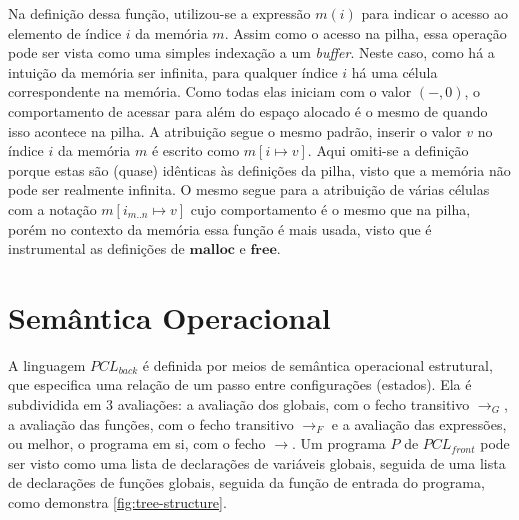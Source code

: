 Na definição dessa função, utilizou-se a expressão $m(i)$ para indicar o acesso ao elemento de índice $i$ da memória $m$. Assim como o acesso na pilha, essa operação pode ser vista como uma simples indexação a um \emph{buffer}. Neste caso, como há a intuição da memória ser infinita, para qualquer índice $i$ há uma célula correspondente na memória. Como todas elas iniciam com o valor $(-,0)$, o comportamento de acessar para além do espaço alocado é o mesmo de quando isso acontece na pilha. A atribuição segue o mesmo padrão, inserir o valor $v$ no índice $i$ da memória $m$ é escrito como $m[i \mapsto v]$. Aqui omiti-se a definição porque estas são (quase) idênticas às definições da pilha, visto que a memória não pode ser realmente infinita. O mesmo segue para a atribuição de várias células com a notação $m[i_{m..n} \mapsto v]$ cujo comportamento é o mesmo que na pilha, porém no contexto da memória essa função é mais usada, visto que é  instrumental as definições de $\mathbf{malloc}$ e $\mathbf{free}$.


\section{Semântica Operacional}

A linguagem $PCL_{back}$ é definida por meios de semântica operacional estrutural, que especifica uma relação de um passo entre configurações (estados). Ela é subdividida em 3 avaliações: a avaliação dos globais, com o fecho transitivo $\to_G$, a avaliação das funções, com o fecho transitivo $\to_F$ e a avaliação das expressões, ou melhor, o programa em si, com o fecho $\to$. Um programa $P$ de $PCL_{front}$ pode ser visto como uma lista de declarações de variáveis globais, seguida de uma lista de declarações de funções globais, seguida da função de entrada do programa, como demonstra \ref{fig:tree-structure}.

